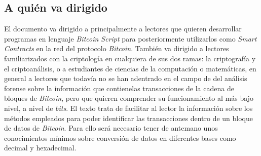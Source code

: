 \documentclass{article}
\begin{document}
    \subsection{A quién va dirigido}
    El documento va dirigido a principalmente a lectores que quieren desarrollar programas en lenguaje \textit{Bitcoin Script} para posteriormente utilizarlos como \textit{Smart Contracts} en la red del protocolo \textit{Bitcoin}. También va dirigido a lectores familiarizados con la criptología en cualquiera de sus dos ramas: la criptografía y el criptoanálisis, o a estudiantes de ciencias de la computación o matemáticas, en general a lectores que todavía no se han adentrado en el campo de del análisis forense sobre la información que contienelas transacciones de la cadena de bloques de \textit{Bitcoin}, pero que quieren comprender su funcionamiento al más bajo nivel, a nivel de \textit{bits}. El texto trata de facilitar al lector la información sobre los métodos empleados para poder identificar las transacciones dentro de un bloque de datos de \textit{Bitcoin}. Para ello será necesario tener de antemano unos conocimientos mínimos sobre conversión de datos en diferentes bases como decimal y hexadecimal.
\end{document}
